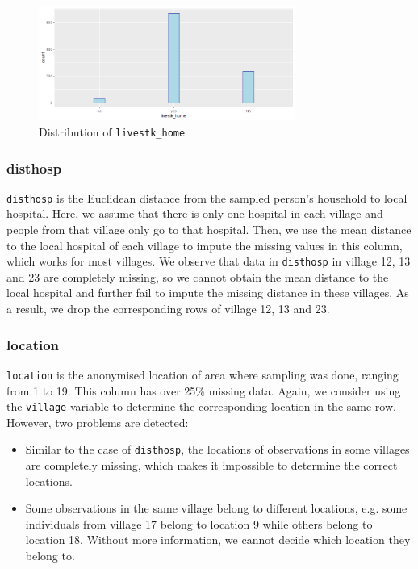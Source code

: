 \documentclass[11pt,twoside]{article}
\numberwithin{Theorem}{section}
\numberwithin{Definition}{section}
\numberwithin{Lemma}{section}
\numberwithin{Algorithm}{section}
\numberwithin{equation}{section}
\begin{document}
\begin{figure}[!h]
	\centering
	\includegraphics[width = 0.75\textwidth]{Images/livestk.png}
	\caption{Distribution of \texttt{livestk\_home}}
	\label{fig:livestk}
\end{figure}

\subsubsection{disthosp}

\texttt{disthosp} is the Euclidean distance from the sampled person's household to local hospital. Here, we assume that there is only one hospital in each village and people from that village only go to that hospital. Then, we use the mean distance to the local hospital of each village to impute the missing values in this column, which works for most villages. We observe that data in \texttt{disthosp} in village 12, 13 and 23 are completely missing, so we cannot obtain the mean distance to the local hospital and further fail to impute the missing distance in these villages. As a result, we drop the corresponding rows of village 12, 13 and 23.

\subsubsection{location}

\texttt{location} is the anonymised location of area where sampling was done, ranging from 1 to 19. This column has over 25\% missing data. Again, we consider using the \texttt{village} variable to determine the corresponding location in the same row. However, two problems are detected:

\begin{itemize}
	\item Similar to the case of \texttt{disthosp}, the locations of observations in some villages are completely missing, which makes it impossible to determine the correct locations.
	\item Some observations in the same village belong to different locations, e.g. some individuals from village 17 belong to location 9 while others belong to location 18. Without more information, we cannot decide which location they belong to. 
\end{itemize}
\end{document}
